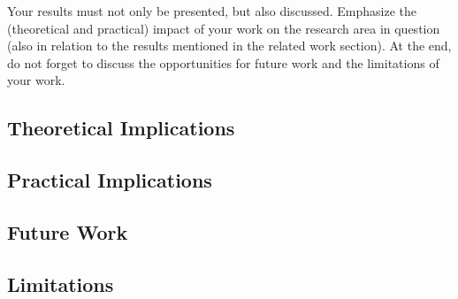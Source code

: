 Your results must not only be presented, but also discussed. Emphasize the (theoretical and practical) impact of your work on the research area in question (also in relation to the results mentioned in the related work section). At the end, do not forget to discuss the opportunities for future work and the limitations of your work.
\par 

\subsection{Theoretical Implications}


\subsection{Practical Implications}


\subsection{Future Work}


\subsection{Limitations}
